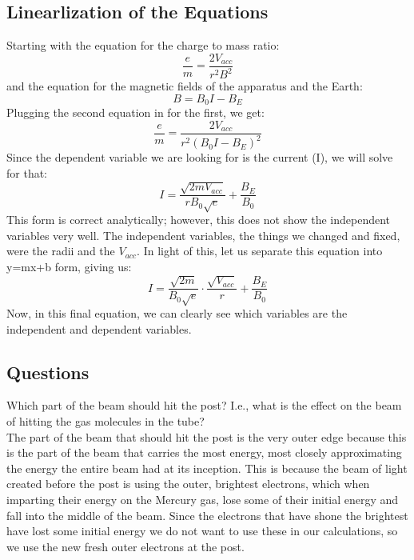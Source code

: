 \documentclass[aps,prl,10pt,twocolumn,floatfix]{revtex4-2}
\begin{document}
\subsection{Linearlization of the Equations}
Starting with the equation for the charge to mass ratio:
\begin{equation}
\frac{e}{m}=\frac{2V_{acc}}{r^2B^2}
\end{equation}
and the equation for the magnetic fields of the apparatus and the Earth: 
\begin{equation}
B=B_0I-B_E
\end{equation}
Plugging the second equation in for the first, we get:
\begin{equation*}
\frac{e}{m}=\frac{2V_{acc}}{r^2(B_0I-B_E)^2}
\end{equation*}
Since the dependent variable we are looking for is the current (I), we will solve for that:
\begin{equation*}
I=\frac{\sqrt{2mV_{acc}}}{rB_0\sqrt{e}}+\frac{B_E}{B_0}
\end{equation*}
This form is correct analytically;
however, this does not show the independent variables very well.
The independent variables, the things we changed and fixed, were the radii and the $V_{acc}$. 
In light of this, let us separate this equation into y=mx+b form, giving us:
\begin{equation}
I=\frac{\sqrt{2m}}{B_0\sqrt{e}}\cdot \frac{\sqrt{V_{acc}}}{r}+\frac{B_E}{B_0}
\end{equation}
Now, in this final equation, we can clearly see which variables are the independent and dependent variables. 
\subsection{Questions}
Which part of the beam should hit the post? I.e., what is the effect on the beam of hitting the gas
molecules in the tube?\\
The part of the beam that should hit the post is the very outer edge because this is the part of the beam that carries the most energy, most closely approximating the energy the entire beam had at its inception. 
This is because the beam of light created before the post is using the outer, brightest electrons, which when imparting their energy on the Mercury gas, lose some of their initial energy and fall into the middle of the beam. 
Since the electrons that have shone the brightest have lost some initial energy we do not want to use these in our calculations, so we use the new fresh outer electrons at the post. 
\end{document}
